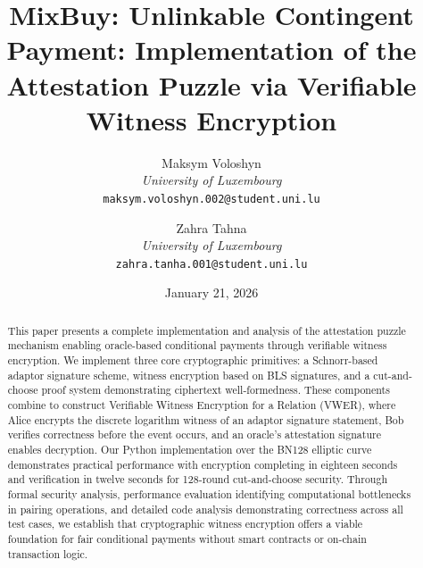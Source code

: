 \documentclass[11pt,a4paper]{article}
\begin{document}
\title{MixBuy: Unlinkable Contingent Payment: Implementation of the Attestation Puzzle via Verifiable Witness Encryption}

\author{
    Maksym Voloshyn\\
    \textit{University of Luxembourg}\\
    \texttt{maksym.voloshyn.002@student.uni.lu}
\and
    Zahra Tahna\\
    \textit{University of Luxembourg}\\
    \texttt{zahra.tanha.001@student.uni.lu}
}


\author{

\date{January 21, 2026}

\maketitle

\begin{abstract}
This paper presents a complete implementation and analysis of the attestation puzzle mechanism enabling oracle-based conditional payments through verifiable witness encryption. We implement three core cryptographic primitives: a Schnorr-based adaptor signature scheme, witness encryption based on BLS signatures, and a cut-and-choose proof system demonstrating ciphertext well-formedness. These components combine to construct Verifiable Witness Encryption for a Relation (VWER), where Alice encrypts the discrete logarithm witness of an adaptor signature statement, Bob verifies correctness before the event occurs, and an oracle's attestation signature enables decryption. Our Python implementation over the BN128 elliptic curve demonstrates practical performance with encryption completing in eighteen seconds and verification in twelve seconds for 128-round cut-and-choose security. Through formal security analysis, performance evaluation identifying computational bottlenecks in pairing operations, and detailed code analysis demonstrating correctness across all test cases, we establish that cryptographic witness encryption offers a viable foundation for fair conditional payments without smart contracts or on-chain transaction logic.


\end{abstract}}
\end{document}
